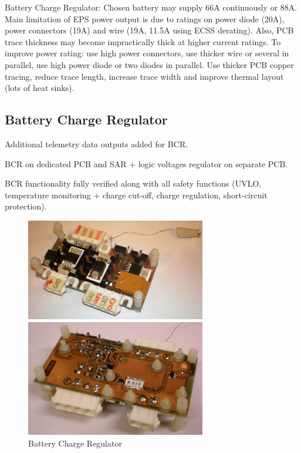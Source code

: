 Battery Charge Regulator:
Chosen battery may supply 66A continuously or 88A. Main limitation of EPS power output is due to ratings on power diode (20A), power connectors (19A) and wire (19A, 11.5A using ECSS derating). Also, PCB trace thickness may become impractically thick at higher current ratings. To improve power rating: use high power connectors, use thicker wire or several in parallel, use high power diode or two diodes in parallel. Use thicker PCB copper tracing, reduce trace length, increase trace width and improve thermal layout (lots of heat sinks).

\subsection{Battery Charge Regulator}

Additional telemetry data outputs added for BCR.

BCR on dedicated PCB and SAR + logic voltages regulator on separate PCB. 

BCR functionality fully verified along with all safety functions (UVLO, temperature monitoring + charge cut-off, charge regulation, short-circuit protection).

\begin{figure}[H]
\begin{minipage}[t]{\linewidth}
\centering
\includegraphics[width=0.7\textwidth]{figures/fig_BCR_top}
\end{minipage}
\vspace{2mm}
\begin{minipage}[t]{\linewidth}
\centering
\includegraphics[width=0.7\textwidth]{figures/fig_BCR_bottom}
\end{minipage}
\caption{Battery Charge Regulator}
\label{fig:BCR_top_bottom}
\end{figure}

